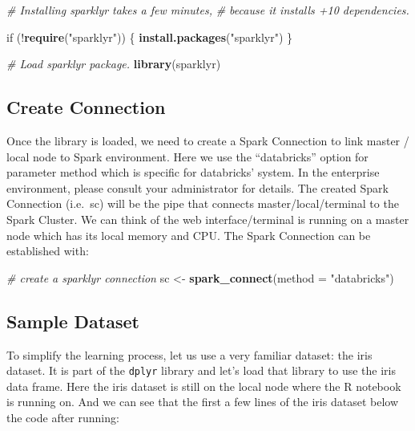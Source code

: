 \documentclass[]{book}
\newenvironment{Shaded}{\begin{snugshade}}{\end{snugshade}}
\newcommand{\KeywordTok}[1]{\textcolor[rgb]{0.13,0.29,0.53}{\textbf{{#1}}}}
\newcommand{\DataTypeTok}[1]{\textcolor[rgb]{0.13,0.29,0.53}{{#1}}}
\newcommand{\StringTok}[1]{\textcolor[rgb]{0.31,0.60,0.02}{{#1}}}
\newcommand{\CommentTok}[1]{\textcolor[rgb]{0.56,0.35,0.01}{\textit{{#1}}}}
\newcommand{\NormalTok}[1]{{#1}}
\theoremstyle{definition}
\theoremstyle{definition}
\theoremstyle{remark}
\begin{document}
\begin{Shaded}
\begin{Highlighting}[]
\CommentTok{# Installing sparklyr takes a few minutes, }
\CommentTok{# because it installs +10 dependencies.}

\NormalTok{if (!}\KeywordTok{require}\NormalTok{(}\StringTok{"sparklyr"}\NormalTok{)) \{}
  \KeywordTok{install.packages}\NormalTok{(}\StringTok{"sparklyr"}\NormalTok{)  }
\NormalTok{\}}

\CommentTok{# Load sparklyr package.}
\KeywordTok{library}\NormalTok{(sparklyr)}
\end{Highlighting}
\end{Shaded}

\subsection{Create Connection}\label{create-connection}

Once the library is loaded, we need to create a Spark Connection to link
master / local node to Spark environment. Here we use the ``databricks''
option for parameter method which is specific for databricks' system. In
the enterprise environment, please consult your administrator for
details. The created Spark Connection (i.e.~sc) will be the pipe that
connects master/local/terminal to the Spark Cluster. We can think of the
web interface/terminal is running on a master node which has its local
memory and CPU. The Spark Connection can be established with:

\begin{Shaded}
\begin{Highlighting}[]
\CommentTok{# create a sparklyr connection }
\NormalTok{sc <-}\StringTok{ }\KeywordTok{spark_connect}\NormalTok{(}\DataTypeTok{method =} \StringTok{"databricks"}\NormalTok{)}
\end{Highlighting}
\end{Shaded}

\subsection{Sample Dataset}\label{sample-dataset}

To simplify the learning process, let us use a very familiar dataset:
the iris dataset. It is part of the \texttt{dplyr} library and let's
load that library to use the iris data frame. Here the iris dataset is
still on the local node where the R notebook is running on. And we can
see that the first a few lines of the iris dataset below the code after
running:
\end{document}
